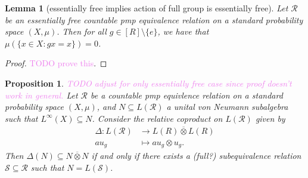 \documentclass[12pt]{article}
\newcommand{\sub}{\subseteq}
\newcommand*\cls[1]{\overline{#1}}
\theoremstyle{definition}
\theoremstyle{plain}
\newtheorem{lemma}{Lemma}[]
\newtheorem{proposition}{Proposition}[]
\theoremstyle{remark}
\begin{document}
\begin{lemma}[essentially free implies action of full group is essentially free]
    Let $ \mathcal{R} $ be an essentially free countable pmp equivalence relation on a standard probability space $ (X,\mu) $. Then for all $ g\in [R]\setminus \{e\} $, we have that $ \mu(\{x\in X: gx = x\}) = 0 $.
\end{lemma}

\begin{proof}
    \textcolor{violet}{TODO prove this}.
\end{proof}

\begin{proposition}
    \textcolor{violet}{TODO adjust for only essentially free case since proof doesn't work in general.}
    Let $ \mathcal{R} $ be a countable pmp equivlence relation on a standard probability space $ (X,\mu) $, and $ N\sub L(\mathcal{R}) $ a unital von Neumann subalgebra such that $ L^{\infty}(X)\sub N $. Consider the relative coproduct on $ L(\mathcal{R}) $ given by
    \begin{align*}
        \Delta : L(\mathcal{R})&\to L(R)\cls{\otimes}L(R)\\
        au_{g} &\mapsto au_{g}\otimes u_{g}.
    \end{align*}
    Then $ \Delta (N)\sub N \cls{\otimes} N $ if and only if there exists a (full?) subequivalence relation $ \mathcal{S}\sub \mathcal{R} $ such that $ N = L(\mathcal{S}) $.
\end{proposition}
\end{document}
